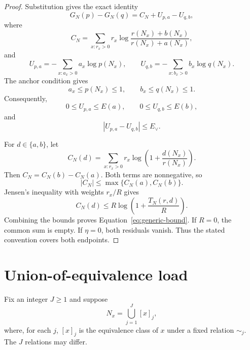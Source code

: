 \documentclass[11pt]{article}
\theoremstyle{definition}
\begin{document}
\begin{proof}
Substitution gives the exact identity
\begin{equation}\label{eq:exact-split}
  G_N(p)-G_N(q)=C_N+U_{p,a}-U_{q,b},
\end{equation}
where
\begin{equation}
  C_N
  =
  \sum_{x:r_x>0}
  r_x
  \log
  \frac{r(N_x)+b(N_x)}{r(N_x)+a(N_x)},
\end{equation}
and
\begin{equation}
  U_{p,a}=-\sum_{x:a_x>0}a_x\log p(N_x),
  \qquad
  U_{q,b}=-\sum_{x:b_x>0}b_x\log q(N_x).
\end{equation}
The anchor condition gives
\begin{equation}
  a_x\le p(N_x)\le1,
  \qquad
  b_x\le q(N_x)\le1.
\end{equation}
Consequently,
\begin{equation}\label{eq:residual-interval}
  0\le U_{p,a}\le E(a),
  \qquad
  0\le U_{q,b}\le E(b),
\end{equation}
and
\begin{equation}
  |U_{p,a}-U_{q,b}|\le E_\vee.
\end{equation}

For \(d\in\{a,b\}\), let
\begin{equation}
  C_N(d)=
  \sum_{x:r_x>0}
  r_x\log\!\left(1+\frac{d(N_x)}{r(N_x)}\right).
\end{equation}
Then \(C_N=C_N(b)-C_N(a)\).  Both terms are nonnegative, so
\begin{equation}
  |C_N|\le\max\{C_N(a),C_N(b)\}.
\end{equation}
Jensen's inequality with weights \(r_x/R\) gives
\begin{equation}
  C_N(d)
  \le
  R\log\!\left(1+\frac{T_N(r,d)}R\right).
\end{equation}
Combining the bounds proves Equation~\eqref{eq:generic-bound}.  If \(R=0\), the common sum is empty.
If \(\eta=0\), both residuals vanish.  Thus the stated convention covers both endpoints.
\end{proof}

\section{Union-of-equivalence load}

Fix an integer \(J\ge1\) and suppose
\begin{equation}\label{eq:union-equivalence}
  N_x=\bigcup_{j=1}^{J}[x]_j,
\end{equation}
where, for each \(j\), \([x]_j\) is the equivalence class of \(x\) under a fixed relation
\(\sim_j\).  The \(J\) relations may differ.
\end{document}
